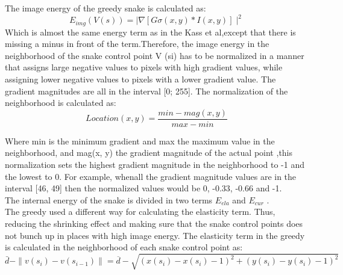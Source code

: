 \hspace{-0.6cm}The image energy of the greedy snake is calculated as:
\begin{equation}
        E_{img}(V(s)) = \mid \nabla [G \sigma(x,y) * I(x,y)] \mid^2
        \label{eq:eq16}
\end{equation}
Which is almost the same energy term as in the Kass et al,except that there is
missing a minus in front of the term.Therefore, the image energy in the
neighborhood of the snake control point V (si) has to be normalized in a
manner that assigns large negative values to pixels with high gradient values,
while assigning lower negative values to pixels with a lower gradient value. The
gradient magnitudes are all in the interval [0; 255]. The normalization of the
neighborhood is calculated as:
\begin{equation}
        Location(x,y) = \frac{min-mag(x,y)}{max - min}
        \label{eq:eq17}
\end{equation}

\hspace{-0.6cm}Where min is the minimum gradient and max the maximum value in the
neighborhood, and mag(x, y) the gradient magnitude of the actual point \cite{2.7},this
normalization sets the highest gradient magnitude in the neighborhood to -1
and the lowest to 0. For example, whenall the gradient magnitude values are in
the interval [46, 49] then the normalized values would be 0, -0.33, -0.66 and -1.\\
The internal energy of the snake is divided in two terms $E_{ela}$ and $E_{cur}$ .\\
The greedy used a different way for calculating the elasticity term. Thus,
reducing the shrinking effect and making sure that the snake control points
does not bunch up in places with high image energy. The elasticity term in the
greedy is calculated in the neighborhood of each snake control point as:
\begin{equation}
        \bar{d} - \| v(s_i) - v(s_{i-1}) \| = \overline{d} - \sqrt{(x(s_i) - x(s_i) - 1)^2 +(y(s_i) - y(s_i) - 1)^2 }
        \label{eq:eq18}
\end{equation}

